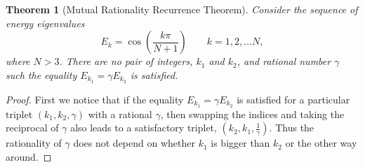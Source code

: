 \documentclass[a4paper, 10pt]{article}
\theoremstyle{plain}
\newtheorem*{theorem*}{Theorem}
\begin{document}
\begin{theorem*}[Mutual Rationality Recurrence Theorem]
    Consider the sequence of energy eigenvalues
    \begin{equation*}
        E_{k} = \cos{\!\left ( \frac{k \pi}{N+1} \right )}
        \qquad k=1, 2, \dots N,
    \end{equation*}
    where $N >3$. There are no pair of integers, $k_{1}$ and $k_{2}$, and
    rational number $\gamma$ such the equality $E_{k_{1}} = \gamma E_{k_{2}}$ is
    satisfied.
\end{theorem*}
\begin{proof}
    First we notice that if the equality $E_{k_{1}} = \gamma E_{k_{2}}$ is
    satisfied for a particular triplet $(k_{1}, k_{2}, \gamma)$ with a rational
    $\gamma$, then swapping the indices and taking the reciprocal of $\gamma$
    also leads to a satisfactory triplet, $(k_{2}, k_{1}, \frac{1}{\gamma})$.
    Thus the rationality of $\gamma$ does not depend on whether $k_{1}$ is
    bigger than $k_{2}$ or the other way around.


\end{proof}
\end{document}
